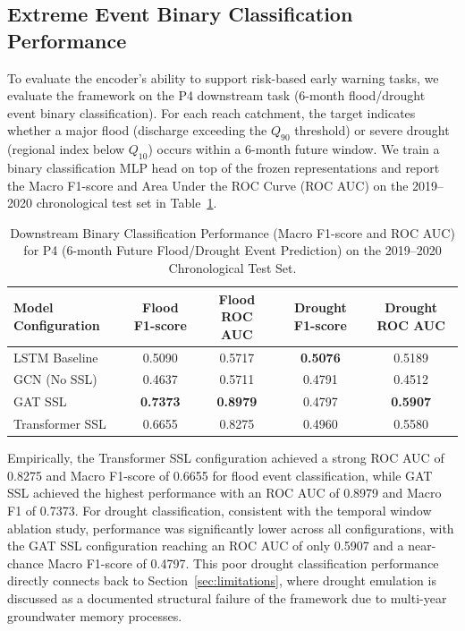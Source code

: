 \documentclass[preprint,12pt]{elsarticle}
\begin{document}
\subsection{Extreme Event Binary Classification Performance}
To evaluate the encoder's ability to support risk-based early warning tasks, we evaluate the framework on the P4 downstream task (6-month flood/drought event binary classification). For each reach catchment, the target indicates whether a major flood (discharge exceeding the $Q_{90}$ threshold) or severe drought (regional index below $Q_{10}$) occurs within a 6-month future window. We train a binary classification MLP head on top of the frozen representations and report the Macro F1-score and Area Under the ROC Curve (ROC AUC) on the 2019--2020 chronological test set in Table~\ref{tab:binary_classification}.

\begin{table}[H]
\centering
\caption{Downstream Binary Classification Performance (Macro F1-score and ROC AUC) for P4 (6-month Future Flood/Drought Event Prediction) on the 2019--2020 Chronological Test Set.}\label{tab:binary_classification}
\begin{tabular}{lcccc}
\toprule
Model Configuration & Flood F1-score & Flood ROC AUC & Drought F1-score & Drought ROC AUC \\
\midrule
LSTM Baseline & 0.5090 & 0.5717 & \textbf{0.5076} & 0.5189 \\
GCN (No SSL) & 0.4637 & 0.5711 & 0.4791 & 0.4512 \\
GAT SSL & \textbf{0.7373} & \textbf{0.8979} & 0.4797 & \textbf{0.5907} \\
Transformer SSL & 0.6655 & 0.8275 & 0.4960 & 0.5580 \\
\bottomrule
\end{tabular}
\end{table}

Empirically, the Transformer SSL configuration achieved a strong ROC AUC of 0.8275 and Macro F1-score of 0.6655 for flood event classification, while GAT SSL achieved the highest performance with an ROC AUC of 0.8979 and Macro F1 of 0.7373. For drought classification, consistent with the temporal window ablation study, performance was significantly lower across all configurations, with the GAT SSL configuration reaching an ROC AUC of only 0.5907 and a near-chance Macro F1-score of 0.4797. This poor drought classification performance directly connects back to Section~\ref{sec:limitations}, where drought emulation is discussed as a documented structural failure of the framework due to multi-year groundwater memory processes.
\end{document}
